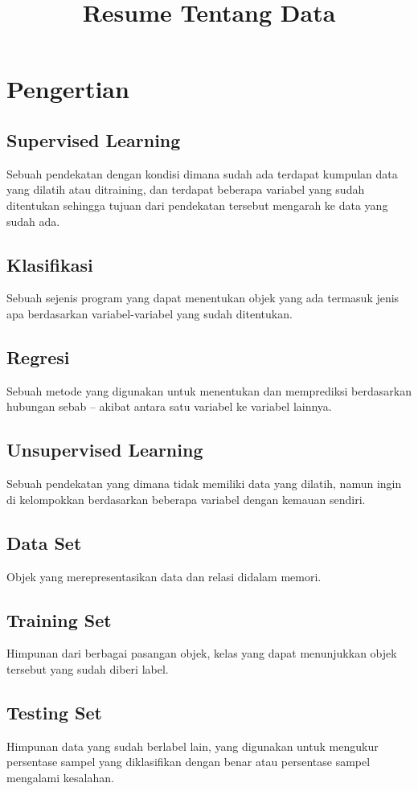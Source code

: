 \documentclass[12pt,a4paper]{article}
\begin{document}
\title{Resume Tentang Data}
\maketitle

\section{Pengertian}
\subsection{Supervised Learning}
Sebuah pendekatan dengan kondisi dimana sudah ada terdapat kumpulan data yang dilatih atau ditraining, dan terdapat beberapa variabel yang sudah ditentukan sehingga tujuan dari pendekatan tersebut mengarah ke data yang sudah ada.

\subsection{Klasifikasi}
Sebuah sejenis program yang dapat menentukan objek yang ada termasuk jenis apa berdasarkan variabel-variabel yang sudah ditentukan.

\subsection{Regresi}
Sebuah metode yang digunakan untuk menentukan dan memprediksi berdasarkan hubungan sebab – akibat antara satu variabel ke variabel lainnya.

\subsection{Unsupervised Learning}
Sebuah pendekatan yang dimana tidak memiliki data yang dilatih, namun ingin di kelompokkan berdasarkan beberapa variabel dengan kemauan sendiri.

\subsection{Data Set}
Objek yang merepresentasikan data dan relasi didalam memori.

\subsection{Training Set}
Himpunan dari berbagai pasangan objek, kelas yang dapat menunjukkan objek tersebut yang sudah diberi label.

\subsection{Testing Set}
Himpunan data yang sudah berlabel lain, yang digunakan untuk mengukur persentase sampel yang diklasifikan dengan benar atau persentase sampel mengalami kesalahan.
\end{document}
